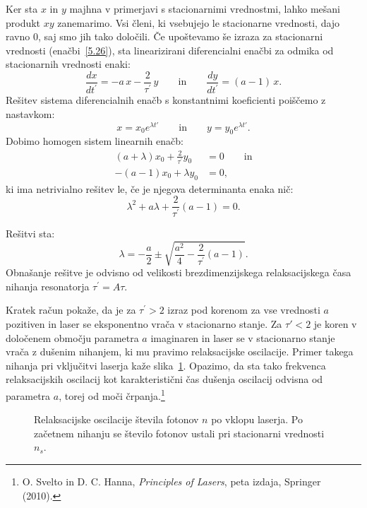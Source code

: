 Ker sta $x$ in $y$ majhna v primerjavi s stacionarnimi vrednostmi, lahko
mešani produkt $xy$ zanemarimo. Vsi členi, ki vsebujejo le stacionarne vrednosti,
dajo ravno 0, saj smo jih tako določili. Če upoštevamo še izraza 
za stacionarni vrednosti (enačbi~\ref{5.26}), 
sta linearizirani diferencialni enačbi za odmika od stacionarnih vrednosti enaki:
\begin{equation}
\frac{dx}{dt^{\prime }} =-a\,x-\frac{2}{\tau ^{\prime }}\,y   \qquad \mathrm{in} \qquad
\frac{dy}{dt^{\prime }} =(a-1)\,x.
\label{5.28}
\end{equation}
Rešitev sistema diferencialnih enačb s konstantnimi
koeficienti poiščemo z nastavkom:
\begin{equation}
x=x_{0}e^{\lambda t'} \qquad \mathrm{in} \qquad 
y=y_{0}e^{\lambda t'}\!\!.
\label{5.29}
\end{equation}
Dobimo homogen sistem linearnih enačb:
\begin{align}
(a+\lambda )x_{0}+\frac{2}{\tau ^{\prime }}y_{0} &=0  \label{5.30} \qquad \mathrm{in}\\
-(a-1)x_{0}+\lambda y_{0} &=0,
\end{align}
ki ima netrivialno rešitev le, če je njegova determinanta enaka nič:
\begin{equation}
\lambda ^{2}+a\lambda +\frac{2}{\tau ^{\prime }}(a-1)=0.  
\label{5.301}
\end{equation}

Rešitvi sta:
\begin{equation}
\lambda =-\frac{a}{2}\pm \sqrt{\frac{a^{2}}{4}-\frac{2}{\tau ^{\prime }}(a-1)}.
\label{5.31}
\end{equation}
Obnašanje rešitve je odvisno od velikosti brezdimenzijskega relaksacijskega
časa nihanja resonatorja $\tau ^{\prime }=A\tau $. 

Kratek račun pokaže, da je 
za $\tau ^{\prime }>2$ izraz pod korenom za vse vrednosti $a$ pozitiven in laser 
se eksponentno vrača v stacionarno stanje. Za $\tau' <2$ je koren v določenem območju
parametra $a$ imaginaren in laser se v stacionarno stanje vrača z
dušenim nihanjem, ki mu pravimo relaksacijske 
oscilacije.
Primer takega nihanja 
pri vključitvi laserja kaže slika~\ref{fig:relax}. Opazimo, da sta tako 
frekvenca relaksacijskih oscilacij kot karakteristični čas dušenja oscilacij
odvisna od parametra $a$, torej od moči črpanja.\footnote{O. Svelto in D. C. Hanna, 
{\it Principles of Lasers}, peta izdaja, 
Springer (2010).}
\begin{figure}[ht]
\centering
\def\svgwidth{80truemm} 

\caption{Relaksacijske oscilacije števila fotonov $n$ po vklopu laserja. Po začetnem
nihanju se število fotonov ustali pri stacionarni vrednosti $n_s$.}
\label{fig:relax}
\end{figure}


